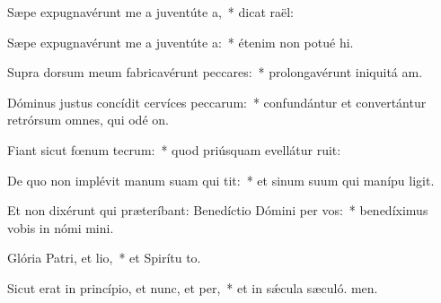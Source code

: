 \item Sæpe expugnavérunt me a juventúte a,~* dicat  raël:
\item Sæpe expugnavérunt me a juventúte a:~* étenim non potué hi.
\item Supra dorsum meum fabricavérunt peccares:~* prolongavérunt iniquitá am.
\item Dóminus justus concídit cervíces peccarum:~* confundántur et convertántur retrórsum omnes, qui odé on.
\item Fiant sicut fœnum tecrum:~* quod priúsquam evellátur ruit:
\item De quo non implévit manum suam qui tit:~* et sinum suum qui manípu ligit.
\item Et non dixérunt qui præteríbant: Benedíctio Dómini per vos:~* benedíximus vobis in nómi mini.
\item Glória Patri, et lio,~* et Spirítu to.
\item Sicut erat in princípio, et nunc, et per,~* et in sǽcula sæculó. men.
